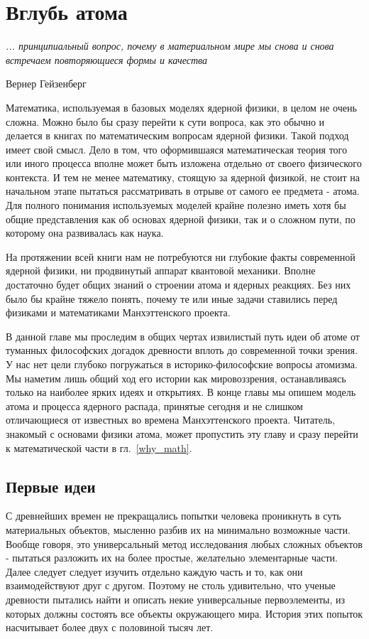 \chapter{Вглубь атома}

\epigraph{\emph{... принципиальный вопрос, почему в материальном мире мы снова и снова встречаем повторяющиеся формы и качества}}
{Вернер Гейзенберг}

Математика, используемая в базовых моделях ядерной физики, в целом не очень сложна.
Можно было бы сразу перейти к сути вопроса, как это обычно и делается в книгах по математическим вопросам ядерной физики.
Такой подход имеет свой смысл.
Дело в том, что оформившаяся математическая теория того или иного процесса вполне может быть изложена отдельно от своего физического контекста.
И тем не менее математику, стоящую за ядерной физикой, не стоит на начальном этапе пытаться рассматривать в отрыве от самого ее предмета - атома.
Для полного понимания используемых моделей крайне полезно иметь хотя бы общие представления как об основах ядерной физики, так и о сложном пути, по которому она развивалась как наука.

На протяжении всей книги нам не потребуются ни глубокие факты современной ядерной физики, ни продвинутый аппарат квантовой механики.
Вполне достаточно будет общих знаний о строении атома и ядерных реакциях.
Без них было бы крайне тяжело понять, почему те или иные задачи ставились перед физиками и математиками Манхэттенского проекта.

В данной главе мы проследим в общих чертах извилистый путь идеи об атоме от туманных философских догадок древности вплоть до современной точки зрения. 
У нас нет цели глубоко погружаться в историко-философские вопросы атомизма.
Мы наметим лишь общий ход его истории как мировоззрения, останавливаясь только на наиболее ярких идеях и открытиях.
В конце главы мы опишем модель атома и процесса ядерного распада, принятые сегодня и не слишком отличающиеся от известных во времена Манхэттенского проекта.
Читатель, знакомый с основами физики атома, может пропустить эту главу и сразу перейти к математической части в гл.~\ref{why_math}.


\section*{Первые идеи}

С древнейших времен не прекращались попытки человека проникнуть в суть материальных объектов, мысленно разбив их на минимально возможные части.
Вообще говоря, это универсальный метод исследования любых сложных объектов - пытаться разложить их на более простые, желательно элементарные части. 
Далее следует следует изучить отдельно каждую часть и то, как они взаимодействуют друг с другом.
Поэтому не столь удивительно, что ученые древности пытались найти и описать некие универсальные первоэлементы, из которых должны состоять все объекты окружающего мира.
История этих попыток насчитывает более двух с половиной тысяч лет.

